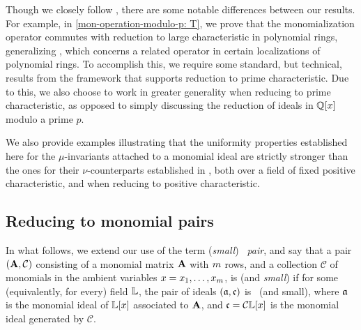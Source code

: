 \documentclass{article}
\begin{document}
Though we closely follow \cite{budur+mustata+saito.roots_bs_polys_monomial}, there are some notable differences between our results.   For example, in \cref{mon-operation-modulo-p: T}, we prove that the monomialization operator commutes with reduction to large characteristic in polynomial rings, generalizing \cite[Lemma 6.2]{budur+mustata+saito.roots_bs_polys_monomial}, which concerns a related operator in certain localizations of polynomial rings.  To accomplish this, we require some standard, but technical, results from the framework that supports reduction to prime characteristic.
Due to this, we also choose to work in greater generality when reducing to prime characteristic, as opposed to simply discussing the reduction of ideals in $\mathbb{Q}[x]$ modulo a prime $p$.

We also provide examples illustrating that the uniformity properties established here for the $\mu$-invariants attached to a monomial ideal are strictly stronger than the ones for their $\nu$-counterparts established in \loccit, both over a field of fixed positive characteristic, and when reducing to positive characteristic.  

\subsection{Reducing to monomial pairs}

In what follows, we extend our use of the term (\emph{small}) \emph{\compatible\ pair}, and say that a pair $(\mathbf{A}, \mathcal{C})$ consisting of a monomial matrix $\mathbf{A}$ with $m$ rows, and a collection $\mathcal{C}$ of monomials in the ambient variables $x = x_1, \ldots, x_{m}$, is \emph{\compatible} (and \emph{small}) if for some (equivalently, for every) field $\mathbb{L}$, the pair of ideals $(\mathfrak{a}, \mathfrak{c})$ is  \compatible\ (and small),  where $\mathfrak{a}$ is the monomial ideal of $\mathbb{L}[x]$ associated to $\mathbf{A}$, and $\mathfrak{c} = \mathcal{C} \mathbb{L}[x]$ is the monomial ideal generated by $\mathcal{C}$.
\end{document}
